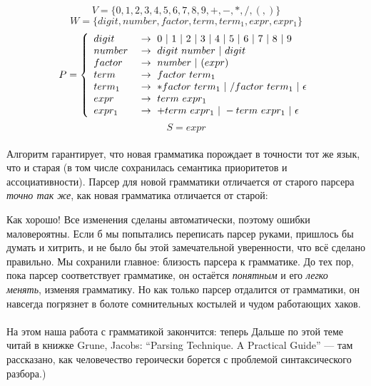 \documentclass[11pt]{book}
\begin{document}
$$V=\{0,1,2,3,4,5,6,7,8,9,+,-,*,/,(,)\}$$
$$W=\{digit, number, factor, term, term_1, expr, expr_1\}$$
$$P=\left\{
\begin{array}{l l}
digit \  & \rightarrow \ 0 \ | \ 1 \ | \ 2 \ | \ 3 \ | \ 4 \ | \ 5 \ | \ 6 \ | \ 7 \ | \ 8 \ | \ 9
\\
number \  & \rightarrow \ digit \ number \ | \ digit
\\
factor \  & \rightarrow \ number \ | \ ( expr )
\\
term \  & \rightarrow \ factor \ term_1
\\
term_1 \  & \rightarrow \ * factor \ term_1 \ | \ / factor \ term_1 \ | \ \epsilon
\\
expr \  & \rightarrow \ term \ expr_1
\\
expr_1 \  & \rightarrow \ + term \ expr_1 \ | \ - term \ expr_1 \ | \ \epsilon
\end{array}
\right. $$
$$S=expr$$
\\
Алгоритм гарантирует, что новая грамматика порождает в точности тот же язык,
что и старая (в том числе сохранилась семантика приоритетов и ассоциативности). Парсер для новой грамматики
отличается от старого парсера \emph{точно так же}, как новая грамматика отличается от старой:


Как хорошо! Все изменения сделаны автоматически, поэтому ошибки маловероятны.
Если б мы попытались переписать парсер руками, пришлось бы думать и хитрить, и
не было бы этой замечательной уверенности, что всё сделано правильно.
Мы сохранили главное: близость парсера к грамматике. До тех пор, пока парсер
соответствует грамматике, он остаётся \emph{понятным} и его \emph{легко менять},
изменяя  грамматику. Но как только парсер отдалится от грамматики,
он навсегда погрязнет в болоте сомнительных костылей и чудом работающих хаков.
\\ \\
На этом наша работа с грамматикой закончится: теперь Дальше по этой теме читай в книжке Grune, Jacobs: ``Parsing Technique. A Practical Guide'' --- там
рассказано, как человечество героически борется с проблемой синтаксического разбора.)
\end{document}
